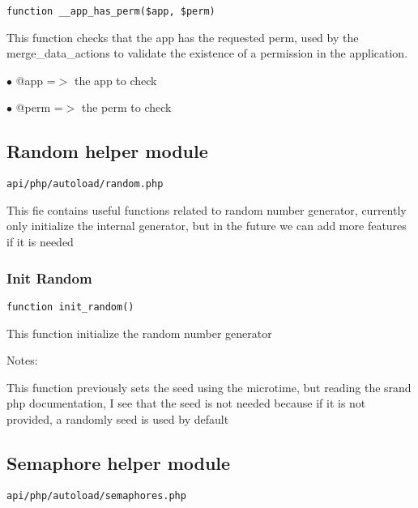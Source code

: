\documentclass[a4paper]{article}
\begin{document}
\begin{lstlisting}
function __app_has_perm($app, $perm)
\end{lstlisting}

This function checks that the app has the requested perm, used by the
merge\_data\_actions to validate the existence of a permission in the
application.

\begin{compactitem}
\item[\color{myblue}$\bullet$] @app  =$>$ the app to check
\item[\color{myblue}$\bullet$] @perm =$>$ the perm to check
\end{compactitem}

\hypertarget{toc201}{}
\subsection{Random helper module}

\begin{lstlisting}
api/php/autoload/random.php
\end{lstlisting}

This fie contains useful functions related to random number generator, currently only initialize
the internal generator, but in the future we can add more features if it is needed

\hypertarget{toc202}{}
\subsubsection{Init Random}

\begin{lstlisting}
function init_random()
\end{lstlisting}

This function initialize the random number generator

Notes:

This function previously sets the seed using the microtime, but reading
the srand php documentation, I see that the seed is not needed because
if it is not provided, a randomly seed is used by default

\hypertarget{toc203}{}
\subsection{Semaphore helper module}

\begin{lstlisting}
api/php/autoload/semaphores.php
\end{lstlisting}
\end{document}
